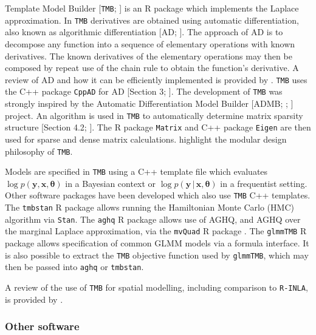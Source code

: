 \documentclass[a4paper, nobind]{templates/ociamthesis}
\begin{document}
Template Model Builder {[}\texttt{TMB}; \textcite{kristensen2016tmb}{]} is an R package which implements the Laplace approximation.
In \texttt{TMB} derivatives are obtained using automatic differentiation, also known as algorithmic differentiation {[}AD; \textcite{baydin2017automatic}{]}.
The approach of AD is to decompose any function into a sequence of elementary operations with known derivatives.
The known derivatives of the elementary operations may then be composed by repeat use of the chain rule to obtain the function's derivative.
A review of AD and how it can be efficiently implemented is provided by \textcite{margossian2019review}.
\texttt{TMB} uses the C++ package \texttt{CppAD} \autocite{cppaddocumentation} for AD {[}Section 3; \textcite{kristensen2016tmb}{]}.
The development of \texttt{TMB} was strongly inspired by the Automatic Differentiation Model Builder {[}ADMB; \textcite{fournier2012ad}; \textcite{bolker2013strategies}{]} project.
An algorithm is used in \texttt{TMB} to automatically determine matrix sparsity structure {[}Section 4.2; \textcite{kristensen2016tmb}{]}.
The R package \texttt{Matrix} and C++ package \texttt{Eigen} are then used for sparse and dense matrix calculations.
\textcite{kristensen2016tmb} highlight the modular design philosophy of \texttt{TMB}.

Models are specified in \texttt{TMB} using a C++ template file which evaluates \(\log p(\mathbf{y}, \mathbf{x}, \boldsymbol{\mathbf{\theta}})\) in a Bayesian context or \(\log p(\mathbf{y} \, | \, \mathbf{x}, \boldsymbol{\mathbf{\theta}})\) in a frequentist setting.
Other software packages have been developed which also use \texttt{TMB} C++ templates.
The \texttt{tmbstan} R package \autocite{monnahan2018no} allows running the Hamiltonian Monte Carlo (HMC) algorithm via \texttt{Stan}.
The \texttt{aghq} R package \autocite{stringer2021implementing} allows use of AGHQ, and AGHQ over the marginal Laplace approximation, via the \texttt{mvQuad} R package \autocite{weiser2016mvquad}.
The \texttt{glmmTMB} R package \autocite{brooks2017glmmtmb} allows specification of common GLMM models via a formula interface.
It is also possible to extract the \texttt{TMB} objective function used by \texttt{glmmTMB}, which may then be passed into \texttt{aghq} or \texttt{tmbstan}.

A review of the use of \texttt{TMB} for spatial modelling, including comparison to \texttt{R-INLA}, is provided by \textcite{osgood2023statistical}.

\hypertarget{other-software}{%
\subsubsection{Other software}\label{other-software}}
\end{document}
